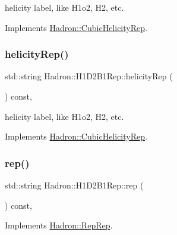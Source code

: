 helicity label, like H1o2, H2, etc. 

Implements \mbox{\hyperlink{structHadron_1_1CubicHelicityRep_af1096946b7470edf0a55451cc662f231}{Hadron\+::\+Cubic\+Helicity\+Rep}}.

\mbox{\label{structHadron_1_1H1D2B1Rep_ac8a7ff273c48151c27ea9e299bc99715}} 
\subsubsection{\texorpdfstring{helicityRep()}{helicityRep()}\hspace{0.1cm}{\footnotesize\ttfamily [2/2]}}
{\footnotesize\ttfamily std\+::string Hadron\+::\+H1\+D2\+B1\+Rep\+::helicity\+Rep (\begin{DoxyParamCaption}{ }\end{DoxyParamCaption}) const\hspace{0.3cm}{\ttfamily [inline]}, {\ttfamily [virtual]}}

helicity label, like H1o2, H2, etc. 

Implements \mbox{\hyperlink{structHadron_1_1CubicHelicityRep_af1096946b7470edf0a55451cc662f231}{Hadron\+::\+Cubic\+Helicity\+Rep}}.

\mbox{\label{structHadron_1_1H1D2B1Rep_a4728e19334216fe0a85733f3356d8716}} 
\subsubsection{\texorpdfstring{rep()}{rep()}\hspace{0.1cm}{\footnotesize\ttfamily [1/3]}}
{\footnotesize\ttfamily std\+::string Hadron\+::\+H1\+D2\+B1\+Rep\+::rep (\begin{DoxyParamCaption}{ }\end{DoxyParamCaption}) const\hspace{0.3cm}{\ttfamily [inline]}, {\ttfamily [virtual]}}



Implements \mbox{\hyperlink{structHadron_1_1RepRep_ab3213025f6de249f7095892109575fde}{Hadron\+::\+Rep\+Rep}}.

\mbox{\label{structHadron_1_1H1D2B1Rep_a4728e19334216fe0a85733f3356d8716}} 
